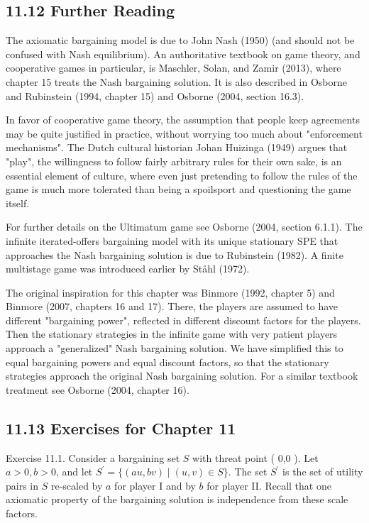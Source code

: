 \documentclass[12pt]{article}
\begin{document}
\subsection*{11.12 Further Reading}
The axiomatic bargaining model is due to John Nash (1950) (and should not be confused with Nash equilibrium). An authoritative textbook on game theory, and cooperative games in particular, is Maschler, Solan, and Zamir (2013), where chapter 15 treats the Nash bargaining solution. It is also described in Osborne and Rubinstein (1994, chapter 15) and Osborne (2004, section 16.3).

In favor of cooperative game theory, the assumption that people keep agreements may be quite justified in practice, without worrying too much about "enforcement mechanisms". The Dutch cultural historian Johan Huizinga (1949) argues that "play", the willingness to follow fairly arbitrary rules for their own sake, is an essential element of culture, where even just pretending to follow the rules of the game is much more tolerated than being a spoilsport and questioning the game itself.

For further details on the Ultimatum game see Osborne (2004, section 6.1.1). The infinite iterated-offers bargaining model with its unique stationary SPE that approaches the Nash bargaining solution is due to Rubinstein (1982). A finite multistage game was introduced earlier by Ståhl (1972).

The original inspiration for this chapter was Binmore (1992, chapter 5) and Binmore (2007, chapters 16 and 17). There, the players are assumed to have different "bargaining power", reflected in different discount factors for the players. Then the stationary strategies in the infinite game with very patient players approach a "generalized" Nash bargaining solution. We have simplified this to equal bargaining powers and equal discount factors, so that the stationary strategies approach the original Nash bargaining solution. For a similar textbook treatment see Osborne (2004, chapter 16).

\subsection*{11.13 Exercises for Chapter 11}
Exercise 11.1. Consider a bargaining set $S$ with threat point ( 0,0 ). Let $a>0, b>0$, and let $S^{\prime}=\{(a u, b v) \mid(u, v) \in S\}$. The set $S^{\prime}$ is the set of utility pairs in $S$ re-scaled by $a$ for player I and by $b$ for player II. Recall that one axiomatic property of the bargaining solution is independence from these scale factors.
\end{document}
